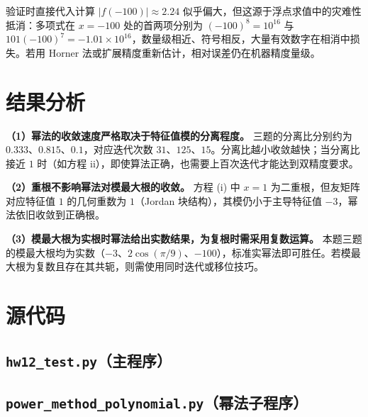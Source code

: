\documentclass[10pt, a4paper]{article}
\begin{document}
验证时直接代入计算 $|f(-100)| \approx 2.24$ 似乎偏大，但这源于浮点求值中的灾难性抵消：多项式在 $x=-100$ 处的首两项分别为 $(-100)^8 = 10^{16}$ 与 $101(-100)^7 = -1.01\times10^{16}$，数量级相近、符号相反，大量有效数字在相消中损失。若用 Horner 法或扩展精度重新估计，相对误差仍在机器精度量级。

\section{结果分析}

\textbf{（1）幂法的收敛速度严格取决于特征值模的分离程度。}
三题的分离比分别约为 $0.333$、$0.815$、$0.1$，对应迭代次数 $31$、$125$、$15$。分离比越小收敛越快；当分离比接近 $1$ 时（如方程 ii），即使算法正确，也需要上百次迭代才能达到双精度要求。

\textbf{（2）重根不影响幂法对模最大根的收敛。}
方程 (i) 中 $x=1$ 为二重根，但友矩阵对应特征值 $1$ 的几何重数为 $1$（Jordan 块结构），其模仍小于主导特征值 $-3$，幂法依旧收敛到正确根。

\textbf{（3）模最大根为实根时幂法给出实数结果，为复根时需采用复数运算。}
本题三题的模最大根均为实数（$-3$、$2\cos(\pi/9)$、$-100$），标准实幂法即可胜任。若模最大根为复数且存在其共轭，则需使用同时迭代或移位技巧。

\appendix
\section{源代码}

\subsection{\texttt{hw12\_test.py}（主程序）}


\subsection{\texttt{power\_method\_polynomial.py}（幂法子程序）}

\end{document}

